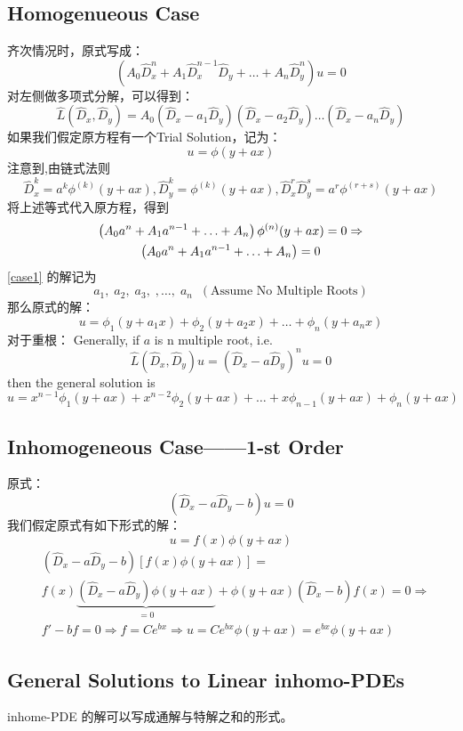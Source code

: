\documentclass[10pt, a4paper, oneside]{ctexbook}
\begin{document}
\subsection{Homogenueous Case}
齐次情况时，原式写成：
$$
\left(A_{0} \hat{D}_{x}^{n}+A_{1} \hat{D}_{x}^{n-1} \hat{D}_{y}+\ldots+A_{n} \hat{D}_{y}^{n}\right) u=0
$$
对左侧做多项式分解，可以得到：
$$
\hat{L}\left(\hat{D}_{x}, \hat{D}_{y}\right)=A_{0}\left(\hat{D}_{x}-a_{1} \hat{D}_{y}\right)\left(\hat{D}_{x}-a_{2} \hat{D}_{y}\right) \ldots\left(\hat{D}_{x}-a_{n} \hat{D}_{y}\right)
$$
如果我们假定原方程有一个Trial Solution，记为：
$$u=\phi (y+ax)$$
注意到,由链式法则
$$
\hat{D}_{x}^{k}=a^{k} \phi^{(k)}(y+a x), \hat{D}_{y}^{k}=\phi^{(k)}(y+a x), \hat{D}_{x}^{r} \hat{D}_{y}^{s}=a^{r} \phi^{(r+s)}(y+a x)
$$
将上述等式代入原方程，得到
\begin{gather}
    \left(A_{0} a^{n}+A_{1} a^{n-1}+\ldots+A_{n}\right) \phi^{(n)}(y+a x)=0 \Rightarrow \notag \\
    \left(A_{0} a^{n}+A_{1} a^{n-1}+\ldots+A_{n}\right) = 0 \label{case1}
\end{gather}
\ref{case1} 的解记为
$$a_1,\;a_2,\;a_3,\;,\dots,\;a_n \;\;(\text{Assume No Multiple Roots})$$
那么原式的解：
$$
u=\phi_{1}\left(y+a_{1} x\right)+\phi_{2}\left(y+a_{2} x\right)+\ldots+\phi_{n}\left(y+a_{n} x\right)
$$
对于重根：
Generally, if $a$ is n multiple root, i.e. 
$$\hat{L}\left(\hat{D}_{x}, \hat{D}_{y}\right) u=\left(\hat{D}_{x}-a \hat{D}_{y}\right)^{n} u=0$$
 then the general solution is
$$
u=x^{n-1} \phi_{1}(y+a x)+x^{n-2} \phi_{2}(y+a x)+\ldots+x \phi_{n-1}(y+a x)+\phi_{n}(y+a x)
$$
\subsection{Inhomogeneous Case——1-st Order}
原式：
$$
(\hat{D}_{x}-a\hat{D}_{y}-b)u=0
$$
我们假定原式有如下形式的解：
$$u=f(x)\phi(y+ax)$$
\begin{align*}
    &\left(\hat{D}_{x}-a \hat{D}_{y}-b\right)[f(x) \phi(y+a x)]=\\
    &f(x) \underbrace{\left(\hat{D}_{x}-a \hat{D}_{y}\right) \phi(y+a x)}_{=0}+\phi(y+a x)\left(\hat{D}_{x}-b\right) f(x)=0 \Rightarrow \\
    &f'-bf=0 \Rightarrow f=Ce^{bx} \Rightarrow u=Ce^{bx}\phi(y+ax)=e^{bx}\phi(y+ax)
\end{align*}
\subsection{General Solutions to Linear inhomo-PDEs}
inhome-PDE 的解可以写成通解与特解之和的形式。
\end{document}
